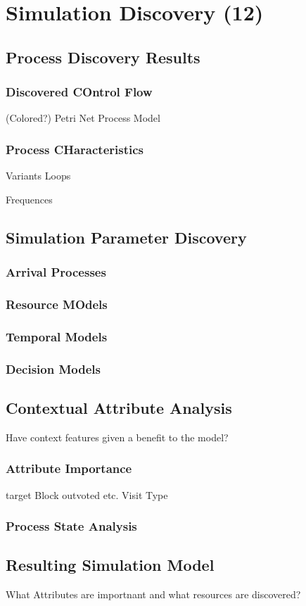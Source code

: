 \chapter{Simulation Discovery (12)}
\label{chp:simulation_model_discovery}

\section{Process Discovery Results}
\subsection{Discovered COntrol Flow}
(Colored?) Petri Net
Process Model

\subsection{Process CHaracteristics}
Variants
Loops

Frequences

\section{Simulation Parameter Discovery}

\subsection{Arrival Processes}

\subsection{Resource MOdels}
\subsection{Temporal Models}
\subsection{Decision Models}

\section{Contextual Attribute Analysis}
Have context features given a benefit to the model?

\subsection{Attribute Importance}
target Block outvoted etc. 
Visit Type
\subsection{Process State Analysis}

\section{Resulting Simulation Model}
What Attributes are importnant and what resources are discovered?

